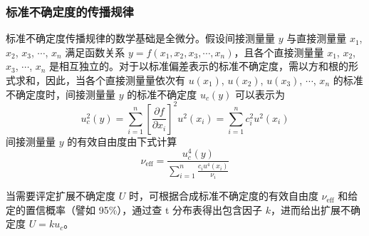     \subsubsection{标准不确定度的传播规律}
    标准不确定度传播规律的数学基础是全微分。假设间接测量量 $y$ 与直接测量量 $x_1$, $x_2$, $x_3$, $\cdots$, $x_n$ 满足函数关系 $y = f(x_1,x_2,x_3,\cdots,x_n)$，且各个直接测量量 $x_1$, $x_2$, $x_3$, $\cdots$, $x_n$ 是相互独立的。对于以标准偏差表示的标准不确定度，需以方和根的形式求和，因此，当各个直接测量量依次有 $u(x_1)$, $u(x_2)$, $u(x_3)$, $\cdots$, $x_n$ 的标准不确定度时，间接测量量 $y$ 的标准不确定度 $u_c(y)$ 可以表示为\\
    \begin{equation}
        u_c^2(y)=\sum_{i=1}^{n}\left[\frac{\partial f}{\partial x_i}\right]^{2}u^2\left(x_{i}\right)=\sum_{i=1}^{n}c_i^2 u^2\left(x_{i}\right) \label{exp:uncertaintyPropagation}
    \end{equation}
    间接测量量 $y$ 的有效自由度由下式计算\\
    \begin{equation}
        \nu_\text{eff}=\frac{u_c^4(y)}{\displaystyle\sum_{i=1}^{n}\frac{c_i u^4(x_i)}{\nu_i}} \label{exp:validFreedom2}
    \end{equation}

    当需要评定扩展不确定度 $U$ 时，可根据合成标准不确定度的有效自由度 $\nu_\text{eff}$ 和给定的置信概率（譬如 95\%），通过查 t 分布表得出包含因子 $k$，进而给出扩展不确定度 $U = k u_c$。
